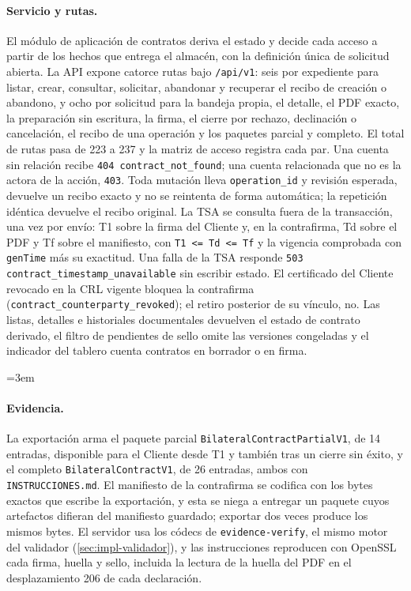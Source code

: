 \paragraph{Servicio y rutas.} El módulo de aplicación de contratos deriva el
estado y decide cada acceso a partir de los hechos que entrega el almacén, con
la definición única de solicitud abierta. La API expone catorce rutas bajo
\texttt{/api/v1}: seis por expediente para listar, crear, consultar, solicitar,
abandonar y recuperar el recibo de creación o abandono, y ocho por solicitud
para la bandeja propia, el detalle, el PDF exacto, la preparación sin
escritura, la firma, el cierre por rechazo, declinación o cancelación, el
recibo de una operación y los paquetes parcial y completo. El total de rutas
pasa de 223 a 237 y la matriz de acceso registra cada par. Una cuenta sin
relación recibe \texttt{404 contract\_not\_found}; una cuenta relacionada que
no es la actora de la acción, \texttt{403}. Toda mutación lleva
\texttt{operation\_id} y revisión esperada, devuelve un recibo exacto y no se
reintenta de forma automática; la repetición idéntica devuelve el recibo
original. La TSA se consulta fuera de la transacción, una vez por envío: T1
sobre la firma del Cliente y, en la contrafirma, Td sobre el PDF y Tf sobre el
manifiesto, con \texttt{T1 <= Td <= Tf} y la vigencia comprobada con
\texttt{genTime} más su exactitud. Una falla de la TSA responde
\texttt{503 contract\_timestamp\_unavailable} sin escribir estado. El
certificado del Cliente revocado en la CRL vigente bloquea la contrafirma
(\texttt{contract\_counterparty\_revoked}); el retiro posterior de su vínculo,
no. Las listas, detalles e historiales documentales devuelven el estado de
contrato derivado, el filtro de pendientes de sello omite las versiones
congeladas y el indicador del tablero cuenta contratos en borrador o en firma.

{\emergencystretch=3em \paragraph{Evidencia.} La exportación arma el paquete parcial
\texttt{BilateralContractPartialV1}, de 14 entradas, disponible para el
Cliente desde T1 y también tras un cierre sin éxito, y el completo
\texttt{BilateralContractV1}, de 26 entradas, ambos con
\texttt{INSTRUCCIONES.md}. El manifiesto de la contrafirma se codifica con los
bytes exactos que escribe la exportación, y esta se niega a entregar un
paquete cuyos artefactos difieran del manifiesto guardado; exportar dos veces
produce los mismos bytes. El servidor usa los códecs de
\texttt{evidence-verify}, el mismo motor del validador
(\cref{sec:impl-validador}), y las instrucciones reproducen con OpenSSL cada
firma, huella y sello, incluida la lectura de la huella del PDF en el
desplazamiento 206 de cada declaración.\par}

